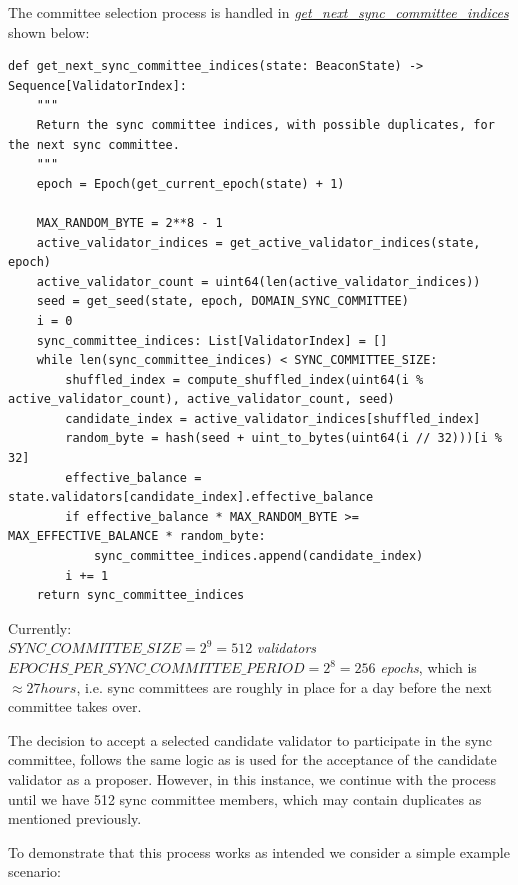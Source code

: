 The committee selection process is handled in \href{https://eth2book.info/capella/part3/helper/accessors/#def\_get\_next\_sync\_committee\_indices}{\textit{get\_next\_sync\_committee\_indices}} \cite{Edgington2023} shown below: 

\lstset{language=Python}

\begin{lstlisting}
def get_next_sync_committee_indices(state: BeaconState) -> Sequence[ValidatorIndex]:
    """
    Return the sync committee indices, with possible duplicates, for the next sync committee.
    """
    epoch = Epoch(get_current_epoch(state) + 1)

    MAX_RANDOM_BYTE = 2**8 - 1
    active_validator_indices = get_active_validator_indices(state, epoch)
    active_validator_count = uint64(len(active_validator_indices))
    seed = get_seed(state, epoch, DOMAIN_SYNC_COMMITTEE)
    i = 0
    sync_committee_indices: List[ValidatorIndex] = []
    while len(sync_committee_indices) < SYNC_COMMITTEE_SIZE:
        shuffled_index = compute_shuffled_index(uint64(i % active_validator_count), active_validator_count, seed)
        candidate_index = active_validator_indices[shuffled_index]
        random_byte = hash(seed + uint_to_bytes(uint64(i // 32)))[i % 32]
        effective_balance = state.validators[candidate_index].effective_balance
        if effective_balance * MAX_RANDOM_BYTE >= MAX_EFFECTIVE_BALANCE * random_byte:
            sync_committee_indices.append(candidate_index)
        i += 1
    return sync_committee_indices
  \end{lstlisting}  
  
  \noindent 
 Currently: \\
 \noindent   
$SYNC\_COMMITTEE\_SIZE = 2^9 = 512$ \textit{ validators}\\
$EPOCHS\_PER\_SYNC\_COMMITTEE\_PERIOD = 2^8 = 256$ \textit{ epochs}, which is $\approx 27 hours$, i.e. sync committees are roughly in place for a day before the next committee takes over.
 
The decision to accept a selected candidate validator  to participate in the sync committee, follows the same logic as is used for the acceptance of the candidate validator as a proposer. However, in this instance, we continue with the process until we have 512 sync committee members, which may contain duplicates as mentioned previously.
 
To demonstrate that this process works as intended we consider a simple example scenario:

